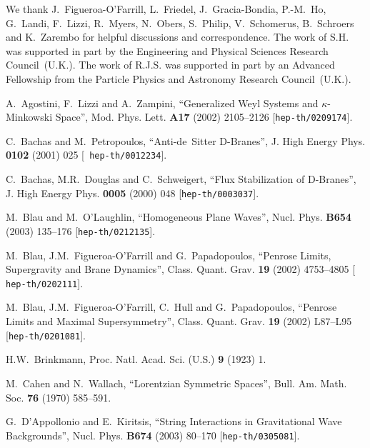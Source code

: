 \documentclass[11pt,a4paper]{article}
\begin{document}
We thank J.~Figueroa-O'Farrill, L.~Friedel, J.~Gracia-Bondia,
P.-M.~Ho, G.~Landi, F.~Lizzi, R.~Myers, N.~Obers, S.~Philip,
V.~Schomerus, B.~Schroers and K.~Zarembo
for helpful discussions and correspondence. The work of S.H. was
supported in part by the Engineering and Physical Sciences Research
Council~(U.K.). The work of R.J.S. was supported in part by an
Advanced Fellowship from the Particle Physics and Astronomy Research
Council~(U.K.).

\begin{thebibliography}{99}

\baselineskip=12pt

 A.~Agostini, F.~Lizzi and A.~Zampini, ``Generalized
  Weyl Systems and $\kappa$-Minkowski Space'', Mod. Phys. Lett. {\bf
  A17} (2002) 2105--2126 [{\tt hep-th/0209174}].

 C.~Bachas and M.~Petropoulos, ``Anti-de~Sitter
  D-Branes'', J. High Energy Phys. {\bf 0102} (2001) 025 [{\tt
  hep-th/0012234}].

 C.~Bachas, M.R.~Douglas and C.~Schweigert, ``Flux
  Stabilization of D-Branes'', J. High Energy Phys. {\bf 0005} (2000)
  048 [{\tt hep-th/0003037}].

 M.~Blau and M.~O'Laughlin, ``Homogeneous Plane Waves'',
  Nucl. Phys. {\bf B654} (2003) 135--176 [{\tt hep-th/0212135}].

 M.~Blau, J.M.~Figueroa-O'Farrill and G.~Papadopoulos,
  ``Penrose Limits, Supergravity and Brane Dynamics'',
  Class. Quant. Grav. {\bf 19} (2002) 4753--4805 [{\tt
  hep-th/0202111}].

 M.~Blau, J.M.~Figueroa-O'Farrill, C.~Hull and
  G.~Papadopoulos, ``Penrose Limits and Maximal Supersymmetry'',
  Class. Quant. Grav. {\bf 19} (2002) L87--L95 [{\tt hep-th/0201081}].

 H.W.~Brinkmann, Proc. Natl. Acad. Sci. (U.S.) {\bf 9}
  (1923) 1.

 M.~Cahen and N.~Wallach, ``Lorentzian Symmetric
  Spaces'', Bull. Am. Math. Soc. {\bf 76} (1970) 585--591.

 G.~D'Appollonio and E.~Kiritsis, ``String Interactions
  in Gravitational Wave Backgrounds'', Nucl. Phys. {\bf B674} (2003)
  80--170 [{\tt hep-th/0305081}].


\end{thebibliography}
\end{document}
